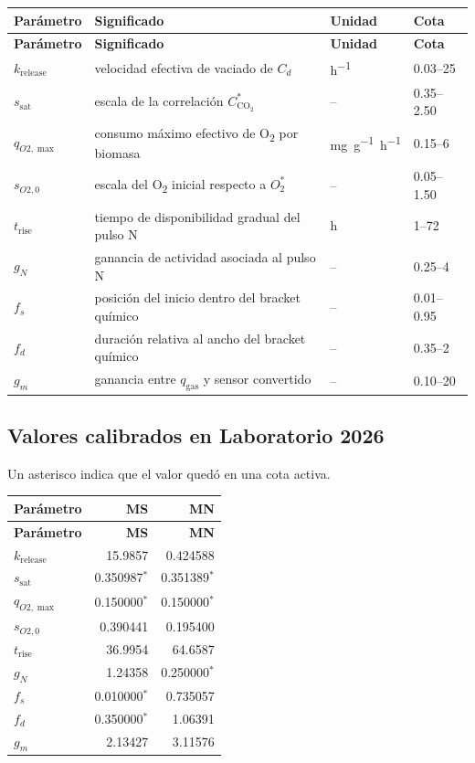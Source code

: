 \documentclass[11pt,a4paper]{article}
\newcommand{\COtwo}{\mathrm{CO_2}}
\begin{document}
\begin{longtable}{p{3.7cm}p{6.5cm}p{2.2cm}p{2.5cm}}
\toprule
\textbf{Parámetro} & \textbf{Significado} & \textbf{Unidad} & \textbf{Cota}\\
\midrule
\endfirsthead
\toprule
\textbf{Parámetro} & \textbf{Significado} & \textbf{Unidad} & \textbf{Cota}\\
\midrule
\endhead
$k_{\mathrm{release}}$ & velocidad efectiva de vaciado de $C_d$ & \si{h^{-1}} & 0.03--25\\
$s_{\mathrm{sat}}$ & escala de la correlación $C_{\COtwo}^{\ast}$ & -- & 0.35--2.50\\
$q_{O2,\max}$ & consumo máximo efectivo de O\textsubscript{2} por biomasa & \si{mg.g^{-1}.h^{-1}} & 0.15--6\\
$s_{O2,0}$ & escala del O\textsubscript{2} inicial respecto a $O_2^\ast$ & -- & 0.05--1.50\\
$t_{\mathrm{rise}}$ & tiempo de disponibilidad gradual del pulso N & \si{h} & 1--72\\
$g_N$ & ganancia de actividad asociada al pulso N & -- & 0.25--4\\
$f_s$ & posición del inicio dentro del bracket químico & -- & 0.01--0.95\\
$f_d$ & duración relativa al ancho del bracket químico & -- & 0.35--2\\
$g_m$ & ganancia entre $q_{\mathrm{gas}}$ y sensor convertido & -- & 0.10--20\\
\bottomrule
\end{longtable}

\subsection{Valores calibrados en Laboratorio 2026}

Un asterisco indica que el valor quedó en una cota activa.

\begin{longtable}{lrr}
\toprule
\textbf{Parámetro} & \textbf{MS} & \textbf{MN}\\
\midrule
\endfirsthead
\toprule
\textbf{Parámetro} & \textbf{MS} & \textbf{MN}\\
\midrule
\endhead
$k_{\mathrm{release}}$ & 15.9857 & 0.424588\\
$s_{\mathrm{sat}}$ & 0.350987$^\ast$ & 0.351389$^\ast$\\
$q_{O2,\max}$ & 0.150000$^\ast$ & 0.150000$^\ast$\\
$s_{O2,0}$ & 0.390441 & 0.195400\\
$t_{\mathrm{rise}}$ & 36.9954 & 64.6587\\
$g_N$ & 1.24358 & 0.250000$^\ast$\\
$f_s$ & 0.010000$^\ast$ & 0.735057\\
$f_d$ & 0.350000$^\ast$ & 1.06391\\
$g_m$ & 2.13427 & 3.11576\\
\bottomrule
\end{longtable}
\end{document}
